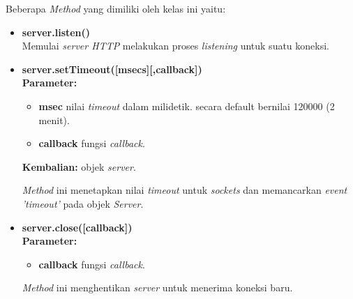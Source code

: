 \begin{enumerate}
	Beberapa \textit{Method} yang dimiliki oleh kelas ini yaitu:
	\begin{itemize}
		\item \textbf{server.listen()} \\ Memulai \textit{server HTTP} melakukan proses \textit{listening} untuk suatu koneksi.
		
		\item \textbf{server.setTimeout([msecs][,callback])} \\ \textbf{Parameter:}
		\begin{itemize}
			\item \textbf{msec} nilai \textit{timeout} dalam milidetik. secara default bernilai 120000 (2 menit).
			\item \textbf{callback} fungsi \textit{callback}.
		\end{itemize}
		\textbf{Kembalian:} objek \textit{server}.
	
		\textit{Method} ini menetapkan nilai \textit{timeout} untuk \textit{sockets} dan memancarkan \textit{event 'timeout'} pada objek \textit{Server}.
		
		\item \textbf{server.close([callback])} \\ \textbf{Parameter:}
		\begin{itemize}
			\item \textbf{callback} fungsi \textit{callback}.
		\end{itemize} 
		
		\textit{Method} ini menghentikan \textit{server} untuk menerima koneksi baru.
	\end{itemize}
\end{enumerate} 

